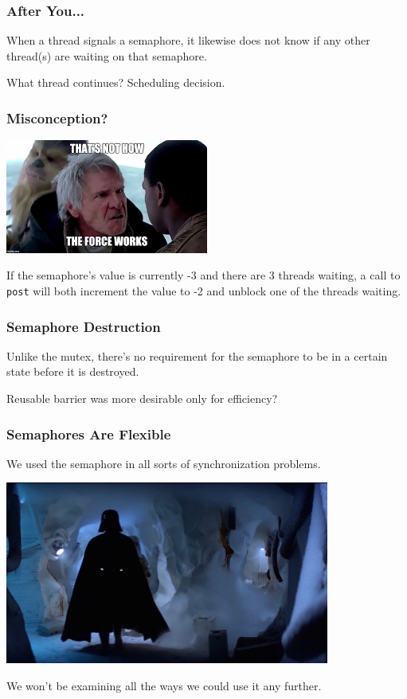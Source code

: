 \begin{frame}
\frametitle{After You...}

When a thread signals a semaphore, it likewise does not know if any other thread(s) are waiting on that semaphore. 

What thread continues? Scheduling decision.

\end{frame}

\begin{frame}
\frametitle{Misconception?}

\begin{center}
	\includegraphics[width=0.5\textwidth]{images/nothowforceworks.jpg}
\end{center}

If the semaphore's value is currently -3 and there are 3 threads waiting, a call to \texttt{post} will both increment the value to -2 and unblock one of the threads waiting.

\end{frame}

\begin{frame}
\frametitle{Semaphore Destruction}

Unlike the mutex, there's no requirement for the semaphore to be in a certain state before it is destroyed.

Reusable barrier was more desirable only for efficiency?

\end{frame}

\begin{frame}
\frametitle{Semaphores Are Flexible}

We used the semaphore in all sorts of synchronization problems.

\begin{center}
	\includegraphics[width=0.8\textwidth]{images/echobase.jpg}
\end{center}

We won't be examining all the ways we could use it any further.

\end{frame}

